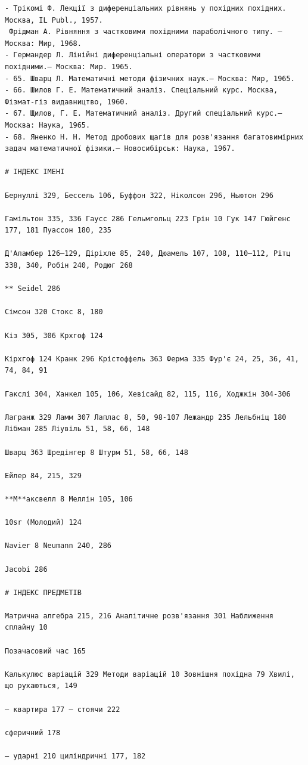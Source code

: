 \documentclass[
  ukrainian,
]{article}
\begin{document}
\begin{verbatim}
- Трікомі Ф. Лекції з диференціальних рівнянь у похідних похідних. Москва, IL Publ., 1957.
 Фрідман А. Рівняння з частковими похідними параболічного типу. — Москва: Мир, 1968.
- Германдер Л. Лінійні диференціальні оператори з частковими похідними.— Москва: Мир. 1965.
- 65. Шварц Л. Математичні методи фізичних наук.— Москва: Мир, 1965.
- 66. Шилов Г. Е. Математичний аналіз. Спеціальний курс. Москва, Фізмат-гіз видавництво, 1960.
- 67. Щилов, Г. Е. Математичний аналіз. Другий спеціальний курс.— Москва: Наука, 1965.
- 68. Яненко Н. Н. Метод дробових щагів для розв'язання багатовимірних задач математичної фізики.— Новосибірськ: Наука, 1967.

# ІНДЕКС ІМЕНІ

Бернуллі 329, Бессель 106, Буффон 322, Ніколсон 296, Ньютон 296

Гамільтон 335, 336 Гаусс 286 Гельмгольц 223 Грін 10 Гук 147 Гюйгенс 177, 181 Пуассон 180, 235

Д'Аламбер 126–129, Діріхле 85, 240, Дюамель 107, 108, 110–112, Рітц 338, 340, Робін 240, Родюг 268

** Seidel 286

Сімсон 320 Стокс 8, 180

Кіз 305, 306 Крхгоф 124

Кірхгоф 124 Кранк 296 Крістоффель 363 Ферма 335 Фур'є 24, 25, 36, 41, 74, 84, 91

Гакслі 304, Ханкел 105, 106, Хевісайд 82, 115, 116, Ходжкін 304-306

Лагранж 329 Ламм 307 Лаплас 8, 50, 98-107 Лежандр 235 Лельбніц 180 Лібман 285 Ліувіль 51, 58, 66, 148

Шварц 363 Шредінгер 8 Штурм 51, 58, 66, 148

Ейлер 84, 215, 329

**М**аксвелл 8 Меллін 105, 106

10sr (Молодий) 124

Navier 8 Neumann 240, 286

Jacobi 286

# ІНДЕКС ПРЕДМЕТІВ

Матрична алгебра 215, 216 Аналітичне розв'язання 301 Наближення сплайну 10

Позачасовий час 165

Калькулюс варіацій 329 Методи варіацій 10 Зовнішня похідна 79 Хвилі, що рухаються, 149

– квартира 177 – стоячи 222

сферичний 178

— ударні 210 циліндричні 177, 182


\end{verbatim}
\end{document}
